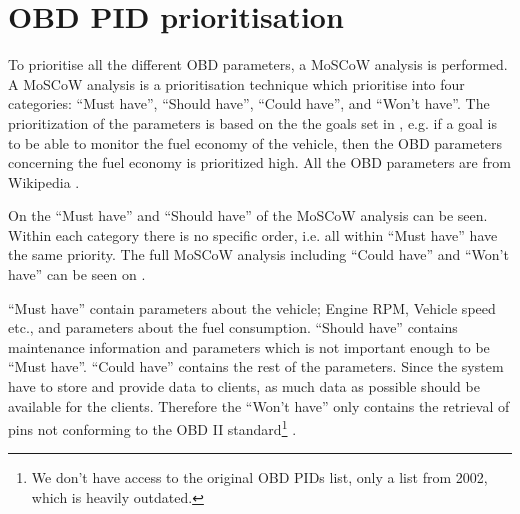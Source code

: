 \section{OBD PID prioritisation}
To prioritise all the different \ac{OBD} parameters, a MoSCoW analysis is performed.
A MoSCoW analysis is a prioritisation technique which prioritise into four categories:
``Must have'', ``Should have'', ``Could have'', and ``Won't have''.
The prioritization of the parameters is based on the the goals set in ,
e.g. if a goal is to be able to monitor the fuel economy of the vehicle,
then the \ac{OBD} parameters concerning the fuel economy is prioritized high.
All the OBD parameters are from Wikipedia\cite{wiki-obd}
.

On  the ``Must have'' and ``Should have'' of the MoSCoW analysis can be seen.
Within each category there is no specific order, i.e. all within ``Must have'' have the same priority.
The full MoSCoW analysis including ``Could have'' and ``Won't have'' can be seen on .

``Must have'' contain parameters about the vehicle; Engine RPM, Vehicle speed etc., and parameters about the fuel consumption.
``Should have'' contains maintenance information and parameters which is not important enough to be ``Must have''.
``Could have'' contains the rest of the parameters.
Since the system have to store and provide data to clients, as much data as possible should be available for the clients.
Therefore the ``Won't have'' only contains the retrieval of pins not conforming to the OBD II standard\footnote{We don't have access to the original OBD PIDs list, only a list from 2002, which is heavily outdated.}
.

